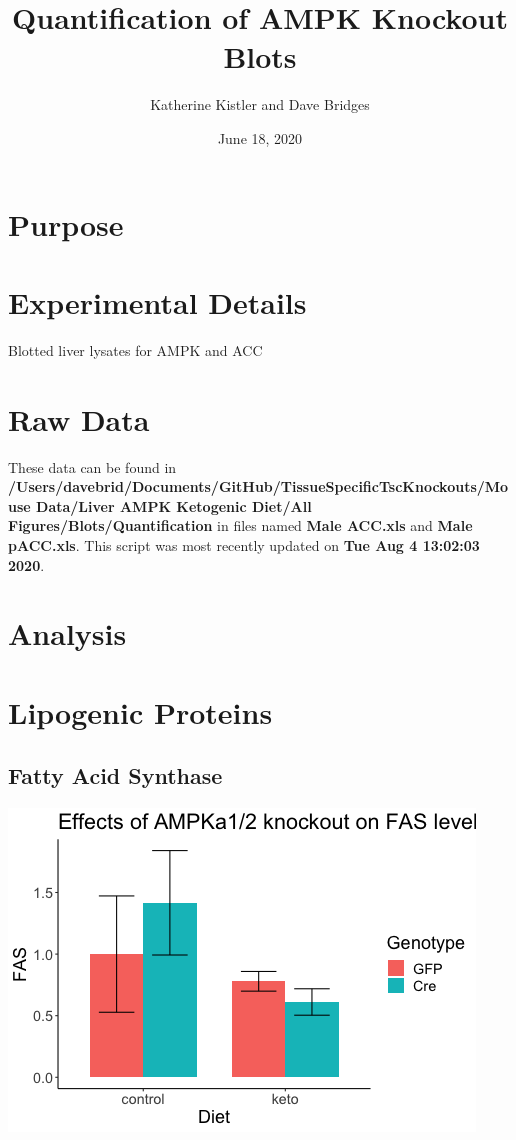 \documentclass[
]{article}
\title{Quantification of AMPK Knockout Blots}
\author{Katherine Kistler and Dave Bridges}
\date{June 18, 2020}
\begin{document}
\maketitle

{
\setcounter{tocdepth}{2}
\tableofcontents
}
\hypertarget{purpose}{%
\section{Purpose}\label{purpose}}

\hypertarget{experimental-details}{%
\section{Experimental Details}\label{experimental-details}}

Blotted liver lysates for AMPK and ACC

\hypertarget{raw-data}{%
\section{Raw Data}\label{raw-data}}

These data can be found in
\textbf{/Users/davebrid/Documents/GitHub/TissueSpecificTscKnockouts/Mouse
Data/Liver AMPK Ketogenic Diet/All Figures/Blots/Quantification} in
files named \textbf{Male ACC.xls} and \textbf{Male pACC.xls}. This
script was most recently updated on \textbf{Tue Aug 4 13:02:03 2020}.

\hypertarget{analysis}{%
\section{Analysis}\label{analysis}}

\hypertarget{lipogenic-proteins}{%
\section{Lipogenic Proteins}\label{lipogenic-proteins}}

\hypertarget{fatty-acid-synthase}{%
\subsection{Fatty Acid Synthase}\label{fatty-acid-synthase}}

\includegraphics{figures/fas-barplot-1.png}
\end{document}
